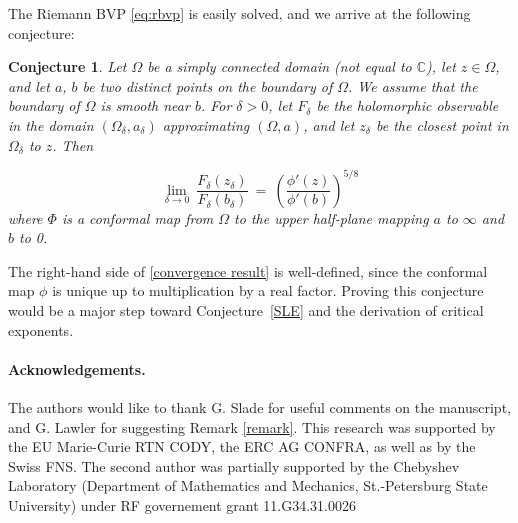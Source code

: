 \documentclass[a4paper,oneside,12pt]{article}
\newtheorem{conjecture}{Conjecture}
\begin{document}
The Riemann BVP \eqref{eq:rbvp} is easily solved, and
we arrive at the following conjecture:

\begin{conjecture}Let $\Omega$ be a simply connected domain (not equal to $\mathbb C$), let 
$z\in \Omega$, and let $a$, $b$ be two distinct points on the boundary of $\Omega$. We assume that the 
boundary of $\Omega$ is smooth near $b$. For $\delta>0$, let $F_\delta$ be the holomorphic observable in the domain $(\Omega_\delta,a_\delta)$ approximating $(\Omega,a)$, and let $z_\delta$ be the closest point in $\Omega_\delta$ to $z$. Then 

\begin{equation} \lim_{\delta\rightarrow 0}~\frac{F_\delta(z_\delta)}{F_\delta(b_\delta)} ~=~\left(\frac{\phi'(z)}{\phi'(b)}\right)^{5/8}\label{convergence result}\end{equation}
where $\Phi$ is a conformal map from $\Omega$ to the upper half-plane mapping $a$ to 
$\infty$ and $b$ 
to 0. 
\end{conjecture}

The right-hand side of \eqref{convergence result} is well-defined, since the conformal map $\phi$ is 
unique up to multiplication by a real factor. Proving this conjecture would be a major step toward Conjecture~\ref{SLE} and the derivation of critical exponents.


\paragraph{Acknowledgements.} The authors would like to thank G. Slade for useful comments on the manuscript, and G. Lawler for suggesting Remark \ref{remark}. 
This research was supported by the EU Marie-Curie RTN CODY, 
the ERC AG CONFRA, as well as by the Swiss
{FNS}. 
The second author was partially supported by the Chebyshev Laboratory
(Department of Mathematics and Mechanics, St.-Petersburg State University) under
RF governement grant 11.G34.31.0026
\end{document}
